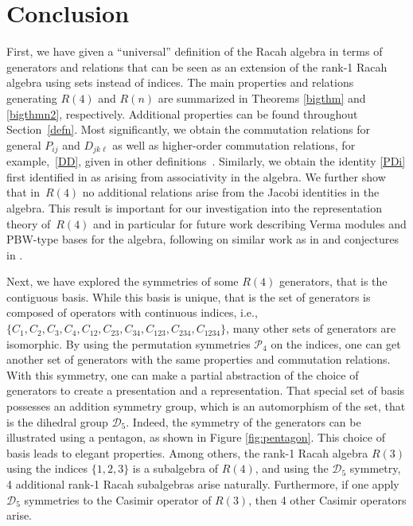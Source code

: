 \documentclass[pdftex]{sigma}
\numberwithin{equation}{section}
\begin{document}
\section{Conclusion}
First, we have given a ``universal'' definition of the Racah algebra in terms of generators and relations that can be seen as an extension of the rank-1 Racah algebra using sets instead of indices. The main properties and relations generating $R(4)$ and $R(n)$ are summarized in Theorems \ref{bigthm} and \ref{bigthmn2}, respectively. Additional properties can be found throughout Section~\ref{defn}. Most significantly, we obtain the commutation relations for general $P_{ij}$ and $D_{jk\ell}$  as well as higher-order commutation relations, for example,~\eqref{DD}, given in other definitions~\cite{CGPAV22}. Similarly, we obtain the identity \eqref{PDi} first identified in \cite{CGPAV22} as arising from associativity in the algebra. We further show that in~$R(4)$ no additional relations arise from the Jacobi identities in the algebra. This result is important for our investigation into the representation theory of~$R(4)$ and in particular for future work describing Verma modules and PBW-type bases for the algebra, following on similar work as in \cite{BCH2020, HBC2020, HBC2021} and conjectures in \cite{BGVV2018}.

Next, we have explored the symmetries of some $R(4)$ generators, that is the contiguous basis. While this basis is unique, that is the set of generators is composed of operators with continuous indices, i.e., $\lbrace C_1 ,  C_2 ,  C_3 ,  C_4 ,  C_{12} ,  C_{23} ,  C_{34} ,  C_{123} ,  C_{234} ,  C_{1234}\rbrace$, many other sets of generators are isomorphic. By using the permutation symmetries $\mathcal{P}_4$ on the indices, one can get another set of generators with the same properties and commutation relations. With this symmetry, one can make a partial abstraction of the choice of generators to create a presentation and a representation. That special set of basis possesses an addition symmetry group, which is an automorphism of the set, that is the dihedral group $\mathcal{D}_5$. Indeed, the symmetry of the generators can be illustrated using a pentagon, as shown in Figure \ref{fig:pentagon}. This choice of basis leads to elegant properties. Among others, the rank-1 Racah algebra $R(3)$ using the indices $\lbrace1,2,3\rbrace$ is a subalgebra of $R(4)$, and using the $\mathcal{D}_5$ symmetry, 4 additional rank-1 Racah subalgebras arise naturally. Furthermore, if one apply $\mathcal{D}_5$ symmetries to the Casimir operator of $R(3)$, then 4 other Casimir operators arise.
\end{document}
